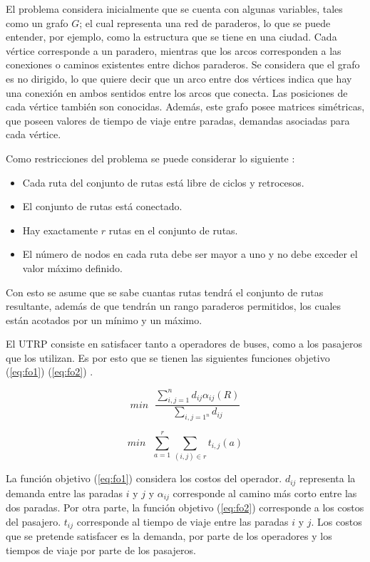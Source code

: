 \documentclass{llncs}
\begin{document}
El problema considera inicialmente que se cuenta con algunas variables, tales como un grafo $G$; el cual representa una red de paraderos, lo que se puede entender, por ejemplo, como la estructura que se tiene en una ciudad. Cada vértice corresponde a un paradero, mientras que los arcos corresponden a las conexiones o caminos existentes entre dichos paraderos. Se considera que el grafo es no dirigido, lo que quiere decir que un arco entre dos vértices indica que hay una conexión en ambos sentidos entre los arcos que conecta. Las posiciones de cada vértice también son conocidas. Además, este grafo posee matrices simétricas, que poseen valores de tiempo de viaje entre paradas, demandas asociadas para cada vértice.

Como restricciones del problema se puede considerar lo siguiente \cite{NewHaEOps}:
\begin{itemize}
\item Cada ruta del conjunto de rutas está libre de ciclos y retrocesos.
\item El conjunto de rutas está conectado.
\item Hay exactamente $r$ rutas en el conjunto de rutas.
\item El número de nodos en cada ruta debe ser mayor a uno y no debe exceder el valor máximo definido.
\end{itemize} 

Con esto se asume que se sabe cuantas rutas tendrá el conjunto de rutas resultante, además de que tendrán un rango paraderos permitidos, los cuales están acotados por un mínimo y un máximo.

El UTRP consiste en satisfacer tanto a operadores de buses, como a los pasajeros que los utilizan. Es por esto que se tienen las siguientes funciones objetivo (\ref{eq:fo1}) (\ref{eq:fo2}) \cite{NewHaEOps}.

\begin{equation}
\label{eq:fo1}
min\mbox{ }\frac{\sum^n_{i,j=1}d_{ij}\alpha_{ij}(R)}{\sum_{i,j=1^n}d_{ij}}
\end{equation} 

\begin{equation}
\label{eq:fo2}
min\mbox{ }\sum^r_{a=1}\sum_{(i,j) \in r} t_{i,j} (a)
\end{equation} 

La función objetivo (\ref{eq:fo1}) considera los costos del operador. $d_{ij}$ representa la demanda  entre las paradas $i$ y $j$ y $\alpha_{ij}$ corresponde al camino más corto entre las dos paradas. Por otra parte, la función objetivo (\ref{eq:fo2}) corresponde a los costos del pasajero. $t_{ij}$ corresponde al tiempo de viaje entre las paradas $i$ y $j$. Los costos que se pretende satisfacer es la demanda, por parte de los operadores y los tiempos de viaje por parte de los pasajeros.
\end{document}
